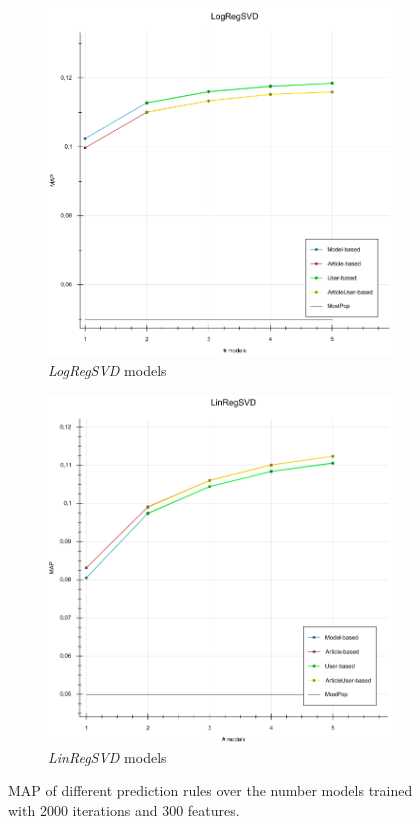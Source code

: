 \documentclass[10pt]{reportMaster}
\begin{document}
\begin{figure}
	\begin{subfigure}[c]{0.5\textwidth}
		\centering
		\includegraphics[width=1\textwidth]{figures/experiments/LogRegSVDPredictionsOModels}
		\caption{\textit{LogRegSVD} models}
		\label{fig:LogRegSVDPredictionsOModels}
	\end{subfigure}
	\begin{subfigure}[c]{0.5\textwidth}
		\centering
		\includegraphics[width=1\textwidth]{figures/experiments/LinRegSVDPredictionsOModels}
		\caption{\textit{LinRegSVD} models}
		\label{fig:LinRegSVDPredictionsOModels}
	\end{subfigure}
	\caption{MAP of different prediction rules over the number models trained with 2000 iterations and 300 features.}
	\label{fig:SVDPredictionOModels}
\end{figure}
\end{document}
